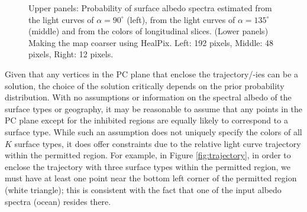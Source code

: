 \documentclass[iop,numberedappendix,apj]{emulateapj}
\begin{document}
\begin{figure}[tbh!]
    \caption{Upper panels: Probability of surface albedo spectra estimated from the light curves of $\alpha = 90^{\circ }$ (left), from the light curves of $\alpha = 135^{\circ }$ (middle) and from the colors of longitudinal slices. (Lower panels) Making the map coarser using HealPix. Left: 192 pixels, Middle: 48 pixels, Right: 12 pixels. }
\label{fig:PCplane}
\end{figure}


Given that any vertices in the PC plane that enclose the trajectory/-ies can be a solution, the choice of the solution critically depends on the prior probability distribution. 
With no assumptions or information on the spectral albedo of the surface types or geography, it may be reasonable to assume that any points in the PC plane except for the inhibited regions are equally likely to correspond to a surface type. 
While such an assumption does not uniquely specify the colors of all $K$ surface types, it does offer constraints due to the relative light curve trajectory within the permitted region. 
For example, in Figure \ref{fig:trajectory}, in order to enclose the trajectory with three surface types within the permitted region, we must have at least one point near the bottom left corner of the permitted region (white triangle); this is consistent with the fact that one of the input albedo spectra (ocean) resides there. 
\end{document}

